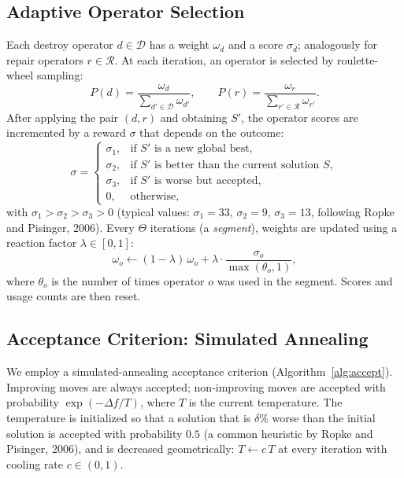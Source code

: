 \documentclass[11pt]{article}
\begin{document}
\subsection{Adaptive Operator Selection}

Each destroy operator $d \in \mathcal{D}$ has a weight $\omega_d$ and a score $\sigma_d$; analogously for repair operators $r \in \mathcal{R}$. At each iteration, an operator is selected by roulette-wheel sampling:
\begin{equation}
P(d) = \frac{\omega_d}{\sum_{d' \in \mathcal{D}} \omega_{d'}}, \qquad P(r) = \frac{\omega_r}{\sum_{r' \in \mathcal{R}} \omega_{r'}}.
\end{equation}
After applying the pair $(d, r)$ and obtaining $S'$, the operator scores are incremented by a reward $\sigma$ that depends on the outcome:
\begin{equation}
\sigma =
\begin{cases}
\sigma_1, & \text{if } S' \text{ is a new global best},\\
\sigma_2, & \text{if } S' \text{ is better than the current solution } S,\\
\sigma_3, & \text{if } S' \text{ is worse but accepted},\\
0,        & \text{otherwise},
\end{cases}
\end{equation}
with $\sigma_1 > \sigma_2 > \sigma_3 > 0$ (typical values: $\sigma_1 = 33$, $\sigma_2 = 9$, $\sigma_3 = 13$, following Ropke and Pisinger, 2006). Every $\Theta$ iterations (a \emph{segment}), weights are updated using a reaction factor $\lambda \in [0, 1]$:
\begin{equation}
\omega_o \gets (1 - \lambda)\, \omega_o + \lambda \cdot \frac{\sigma_o}{\max(\theta_o, 1)},
\end{equation}
where $\theta_o$ is the number of times operator $o$ was used in the segment. Scores and usage counts are then reset.

\subsection{Acceptance Criterion: Simulated Annealing}

We employ a simulated-annealing acceptance criterion (Algorithm~\ref{alg:accept}). Improving moves are always accepted; non-improving moves are accepted with probability $\exp\!\left(-\Delta f / T\right)$, where $T$ is the current temperature. The temperature is initialized so that a solution that is $\delta$\% worse than the initial solution is accepted with probability $0.5$ (a common heuristic by Ropke and Pisinger, 2006), and is decreased geometrically: $T \gets c\,T$ at every iteration with cooling rate $c \in (0,1)$.
\end{document}
